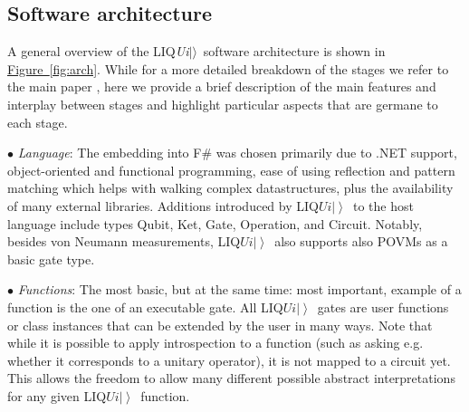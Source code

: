 \documentclass[conference]{IEEEtran}
\newcommand{\fig}[1]{\hyperref[fig:#1]{Figure~\ref*{fig:#1}}}
\newcommand{\ket}[1]{\left| #1\right\rangle}        %
\newcommand{\Liquid}{LIQ$Ui\ket{}$\ }
\newcommand{\REVS}{{\textsc{Revs}}}
\newcommand{\LIQUID}{{LIQ{\em Ui}$|\rangle$}}
\begin{document}
\subsection{Software architecture}

A general overview of the \LIQUID~software architecture is shown in \fig{arch}. While for a more detailed breakdown of the stages we refer to the main paper \cite{WS:2014}, here we provide a brief description of the main features and interplay between stages and highlight  particular aspects that are germane to each stage. 

\noindent $\bullet$ {\em Language}: The embedding into F\# was chosen primarily due to .NET support, object-oriented and functional programming, ease of using reflection and pattern matching which helps with walking complex datastructures, plus the availability of many external libraries. Additions introduced by \Liquid to the host language include types {\sc Qubit}, {\sc Ket}, {\sc Gate}, {\sc Operation}, and {\sc Circuit}. Notably, besides von Neumann measurements, \Liquid also supports also POVMs as a basic gate type. 

\noindent $\bullet$ {\em Functions}: The most basic, but at the same time: most important, example of a function is the one of an executable gate. All \Liquid gates are user functions or class instances that can be extended by the user in many ways. Note that while it is possible to apply introspection to a function (such as asking e.g. whether it corresponds to a unitary operator), it is not mapped to a circuit yet. This allows the freedom to allow many different possible abstract interpretations for any given \Liquid function.%
\end{document}
